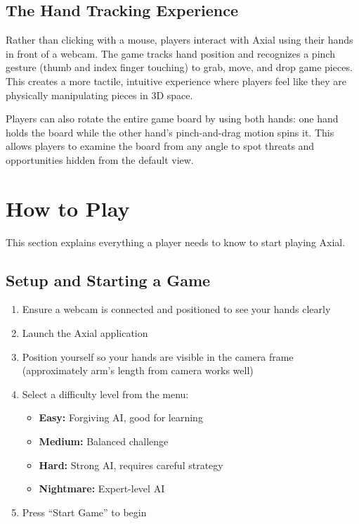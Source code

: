 \documentclass[11pt]{article}
\begin{document}

\subsection{The Hand Tracking Experience}

Rather than clicking with a mouse, players interact with Axial using their hands in front of a webcam. The game tracks hand position and recognizes a pinch gesture (thumb and index finger touching) to grab, move, and drop game pieces. This creates a more tactile, intuitive experience where players feel like they are physically manipulating pieces in 3D space.

Players can also rotate the entire game board by using both hands: one hand holds the board while the other hand's pinch-and-drag motion spins it. This allows players to examine the board from any angle to spot threats and opportunities hidden from the default view.

\section{How to Play}

This section explains everything a player needs to know to start playing Axial.

\subsection{Setup and Starting a Game}

\begin{enumerate}
    \item Ensure a webcam is connected and positioned to see your hands clearly
    \item Launch the Axial application
    \item Position yourself so your hands are visible in the camera frame (approximately arm's length from camera works well)
    \item Select a difficulty level from the menu:
    \begin{itemize}
        \item \textbf{Easy:} Forgiving AI, good for learning
        \item \textbf{Medium:} Balanced challenge
        \item \textbf{Hard:} Strong AI, requires careful strategy
        \item \textbf{Nightmare:} Expert-level AI
    \end{itemize}
    \item Press ``Start Game'' to begin
\end{enumerate}
\end{document}
